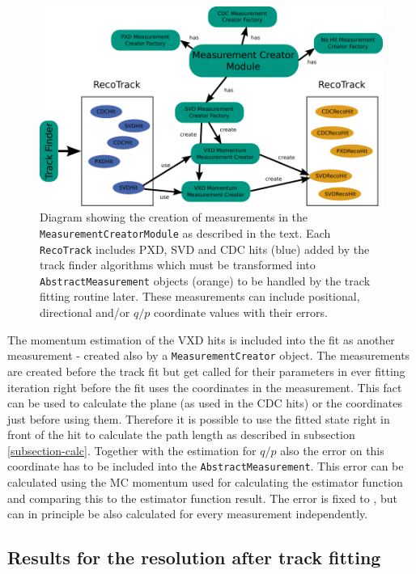 \begin{figure}
  \centering
  \includegraphics[width=\linewidth]{figures/vxd/measurementCreator.pdf}
  \caption[Diagram showing the creation of measurements.]{Diagram showing the creation of measurements in the \texttt{MeasurementCreatorModule} as described in the text. Each \texttt{RecoTrack} includes PXD, SVD and CDC hits (blue) added by the track finder algorithms which must be transformed into \texttt{AbstractMeasurement} objects (orange) to be handled by the track fitting routine later. These measurements can include positional, directional and/or $q/p$ coordinate values with their errors.}
  \label{fig-measurement-creator}
\end{figure}

The momentum estimation of the VXD hits is included into the fit as another measurement - created also by a \texttt{MeasurementCreator} object. The measurements are created before the track fit but get called for their parameters in ever fitting iteration right before the fit uses the coordinates in the measurement. This fact can be used to calculate the plane (as used in the CDC hits) or the coordinates just before using them. Therefore it is possible to use the fitted state right in front of the hit to calculate the path length as described in subsection \ref{subsection-calc}. Together with the estimation for $q/p$ also the error on this coordinate has to be included into the \texttt{AbstractMeasurement}. This error can be calculated using the MC momentum used for calculating the estimator function and comparing this to the estimator function result. The error is fixed to , but can in principle be also calculated for every measurement independently.

\subsection{Results for the resolution after track fitting}

